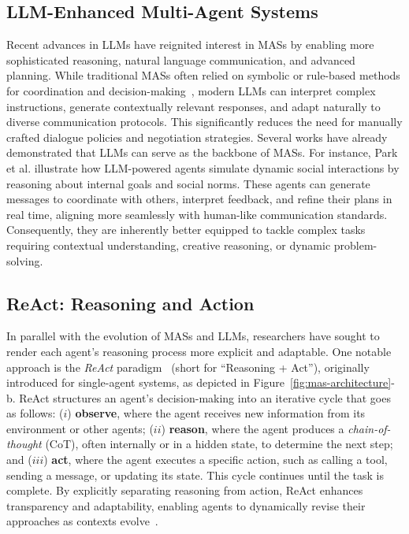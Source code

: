\subsection{LLM-Enhanced Multi-Agent Systems}
Recent advances in LLMs have reignited interest in MASs by enabling more sophisticated reasoning, natural language communication, and advanced planning. While traditional MASs often relied on symbolic or rule-based methods for coordination and decision-making~\cite{genesereth1994software,genesereth1997agent}, modern LLMs can interpret complex instructions, generate contextually relevant responses, and adapt naturally to diverse communication protocols. This significantly reduces the need for manually crafted dialogue policies and negotiation strategies. Several works have already demonstrated that LLMs can serve as the backbone of MASs. For instance, Park et al.\cite{park2023generative} illustrate how LLM-powered agents simulate dynamic social interactions by reasoning about internal goals and social norms. These agents can generate messages to coordinate with others, interpret feedback, and refine their plans in real time, aligning more seamlessly with human-like communication standards\cite{andreas2022language}. Consequently, they are inherently better equipped to tackle complex tasks requiring contextual understanding, creative reasoning, or dynamic problem-solving.

\subsection{ReAct: Reasoning and Action}
In parallel with the evolution of MASs and LLMs, researchers have sought to render each agent's reasoning process more explicit and adaptable. One notable approach is the {\em ReAct} paradigm~\cite{yao2022react} (short for ``Reasoning + Act''), originally introduced for single-agent systems, as depicted in Figure~\ref{fig:mas-architecture}-b. ReAct structures an agent's decision-making into an iterative cycle that goes as follows: ($i$) {\bf observe}, where the agent receives new information from its environment or other agents; ($ii$) {\bf reason}, where the agent produces a {\em chain-of-thought} (CoT), often internally or in a hidden state, to determine the next step; and ($iii$) {\bf act}, where the agent executes a specific action, such as calling a tool, sending a message, or updating its state. This cycle continues until the task is complete. By explicitly separating reasoning from action, ReAct enhances transparency and adaptability, enabling agents to dynamically revise their approaches as contexts evolve~\cite{wei2022chain}.

